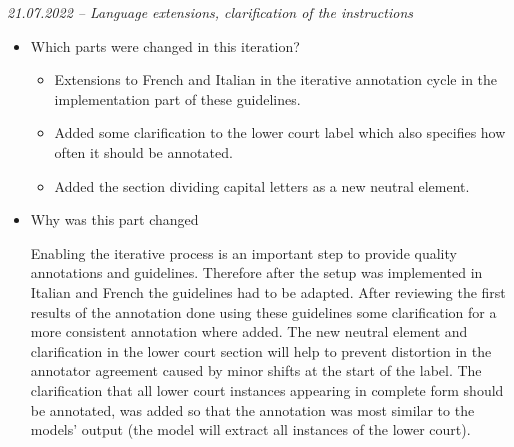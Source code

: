 \documentclass{article}
\begin{document}
\begin{mdframed}
\emph{21.07.2022 – Language extensions, clarification of the instructions}
\begin{itemize}
	\item Which parts were changed in this iteration? 
	\begin{itemize}
	    \item Extensions to French and Italian in the iterative annotation cycle in the implementation part of these guidelines.
	    \item Added some clarification to the lower court label which also specifies how often it should be annotated.
	    \item Added the section dividing capital letters as a new neutral element.
	    
	\end{itemize} 
    \item Why was this part changed
    
    Enabling the iterative process is an important step to provide quality annotations and guidelines. Therefore after the setup was implemented in Italian and French the guidelines had to be adapted. After reviewing the first results of the annotation done using these guidelines some clarification for a more consistent annotation where added. The new neutral element and clarification in the lower court section will help to prevent distortion in the annotator agreement caused by minor shifts at the start of the label. The clarification that all lower court instances appearing in complete form should be annotated, was added so that the annotation was most similar to the models' output (the model will extract all instances of the lower court).
\end{itemize}
\end{mdframed}


\pagebreak

\listoffigures
\end{document}
